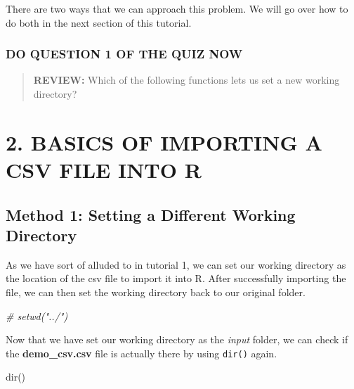 \documentclass[
]{book}
\newenvironment{Shaded}{\begin{snugshade}}{\end{snugshade}}
\newcommand{\CommentTok}[1]{\textcolor[rgb]{0.56,0.35,0.01}{\textit{#1}}}
\newcommand{\FunctionTok}[1]{\textcolor[rgb]{0.00,0.00,0.00}{#1}}
\newcommand{\NormalTok}[1]{#1}
\begin{document}
There are two ways that we can approach this problem. We will go over how to do both in the next section of this tutorial.

\hypertarget{do-question-1-of-the-quiz-now}{%
\subsubsection{DO QUESTION 1 OF THE QUIZ NOW}\label{do-question-1-of-the-quiz-now}}

\begin{quote}
\textbf{REVIEW:} Which of the following functions lets us set a new working directory?
\end{quote}

\hypertarget{basics-of-importing-a-csv-file-into-r}{%
\section{2. BASICS OF IMPORTING A CSV FILE INTO R}\label{basics-of-importing-a-csv-file-into-r}}

\hypertarget{method-1-setting-a-different-working-directory}{%
\subsection{Method 1: Setting a Different Working Directory}\label{method-1-setting-a-different-working-directory}}

As we have sort of alluded to in tutorial 1, we can set our working directory as the location of the csv file to import it into R. After successfully importing the file, we can then set the working directory back to our original folder.

\begin{Shaded}
\begin{Highlighting}[]
\CommentTok{\# setwd("../")}
\end{Highlighting}
\end{Shaded}

Now that we have set our working directory as the \emph{input} folder, we can check if the \textbf{demo\_csv.csv} file is actually there by using \texttt{dir()} again.

\begin{Shaded}
\begin{Highlighting}[]
\FunctionTok{dir}\NormalTok{()}
\end{Highlighting}
\end{Shaded}
\end{document}
